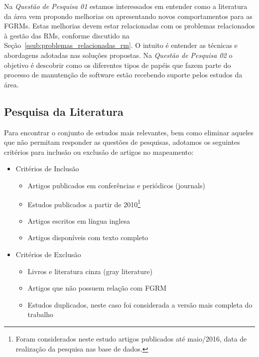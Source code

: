 Na \textit{Questão de Pesquisa 01} estamos interessados em entender como a
literatura da área vem propondo melhorias ou apresentando novos comportamentos
para as FGRMs. Estas melhorias devem estar relacionadas com os problemas
relacionados à gestão das RMs, conforme discutido na
Seção~\ref{ssub:problemas_relacionadas_rm}. O intuito é entender as técnicas e
abordagens adotadas nas soluções propostas. Na \textit{Questão de Pesquisa 02} o
objetivo é descobrir como os diferentes tipos de papéis que fazem parte do
processo de manutenção de software estão recebendo suporte pelos estudos da
área.

\subsection{Pesquisa da Literatura}
\label{subsec:map-pesquisa-literatura}

Para encontrar o conjunto de estudos mais relevantes, bem como eliminar aqueles
que não permitam responder as questões de pesquisas, adotamos os seguintes
critérios para inclusão ou exclusão de artigos no mapeamento:

\begin{itemize}
	\item Critérios de Inclusão
		\begin{itemize}
			\item Artigos
				publicados em conferências e periódicos (journals)
			\item Estudos
				publicados a partir de 2010\footnote{Foram considerados neste
					estudo artigos publicados até maio/2016, data de realização
					da pesquisa nas base de dados.}
			\item Artigos escritos em
				língua inglesa
			\item Artigos disponíveis com texto
				completo
		\end{itemize}
	\item Critérios de Exclusão
		\begin{itemize}
			\item Livros e literatura cinza (gray literature)
			\item Artigos que não possuem relação com FGRM
			\item Estudos duplicados, neste caso foi considerada a versão mais
				completa do trabalho
		\end{itemize}
\end{itemize}

